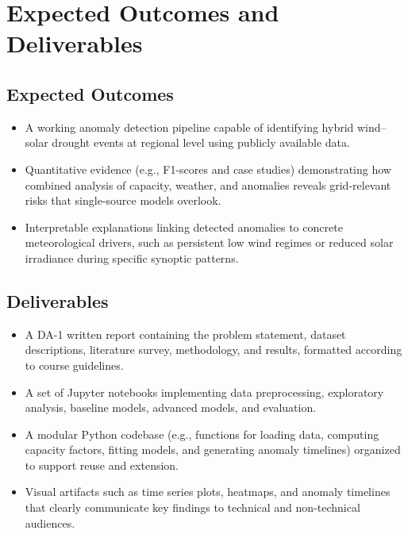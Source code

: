 \documentclass[12pt,a4paper]{article}
\begin{document}
\section{Expected Outcomes and Deliverables}

\subsection*{Expected Outcomes}
\begin{itemize}
    \item A working anomaly detection pipeline capable of identifying hybrid wind--solar drought events at regional level using publicly available data.\cite{lead_anomaly,grid_change_point}
    \item Quantitative evidence (e.g., F1-scores and case studies) demonstrating how combined analysis of capacity, weather, and anomalies reveals grid-relevant risks that single-source models overlook.\cite{lead_anomaly}
    \item Interpretable explanations linking detected anomalies to concrete meteorological drivers, such as persistent low wind regimes or reduced solar irradiance during specific synoptic patterns.\cite{mongabay_droughts,era5}
\end{itemize}

\subsection*{Deliverables}
\begin{itemize}
    \item A DA-1 written report containing the problem statement, dataset descriptions, literature survey, methodology, and results, formatted according to course guidelines.
    \item A set of Jupyter notebooks implementing data preprocessing, exploratory analysis, baseline models, advanced models, and evaluation.\cite{lead_anomaly}
    \item A modular Python codebase (e.g., functions for loading data, computing capacity factors, fitting models, and generating anomaly timelines) organized to support reuse and extension.
    \item Visual artifacts such as time series plots, heatmaps, and anomaly timelines that clearly communicate key findings to technical and non-technical audiences.
\end{itemize}



\end{document}
